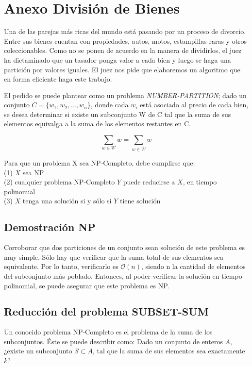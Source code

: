 \section{Anexo División de Bienes}

Una de las parejas más ricas del mundo está pasando por un proceso de divorcio. Entre sus bienes cuentan con propiedades, autos, motos, estampillas raras y otros coleccionables. Como no se ponen de acuerdo en la manera de dividirlos, el juez ha dictaminado que un tasador ponga valor a cada bien y luego se haga una partición por valores iguales. El juez nos pide que elaboremos un algoritmo que en forma eficiente haga este trabajo.\newline

El pedido se puede plantear como un problema \textit{NUMBER-PARTITION}; dado un conjunto $C=\{w_{1}, w_{2}, ..., w_{n}\}$, donde cada $w_{i}$ está asociado al precio de cada bien, se desea determinar si existe un subconjunto W de C tal que la suma de sus elementos equivalga a la suma de los elementos restantes en C.

\begin{equation}
    \sum_{w\in W} w  = \sum_{w\in\overline{W}} w
\end{equation}

Para que un problema X sea NP-Completo, debe cumplirse que: \\
(1) $X$ sea NP\\
(2) cualquier problema NP-Completo $Y$ puede reducirse a $X$, en tiempo polinomial\\
(3) $X$ tenga una solución si y sólo si $Y$ tiene solución

\subsection{Demostración NP}

Corroborar que dos particiones de un conjunto sean solución de este problema es muy simple.  Sólo hay que verificar que la suma total de sus elementos sea equivalente. 
Por lo tanto, verificarlo es $\mathcal{O}(n)$, siendo n la cantidad de elementos del subconjunto más poblado. 
Entonces, al poder verificar la solución en tiempo polinomial, se puede asegurar que este problema es NP.

\subsection{Reducción del problema SUBSET-SUM}
Un conocido problema NP-Completo es el problema de la suma de los subconjuntos. 
Éste se puede describir como: Dado un conjunto de enteros $A$, ¿existe un subconjunto $S \subset A$, tal que la suma de sus elementos sea exactamente $k$?

